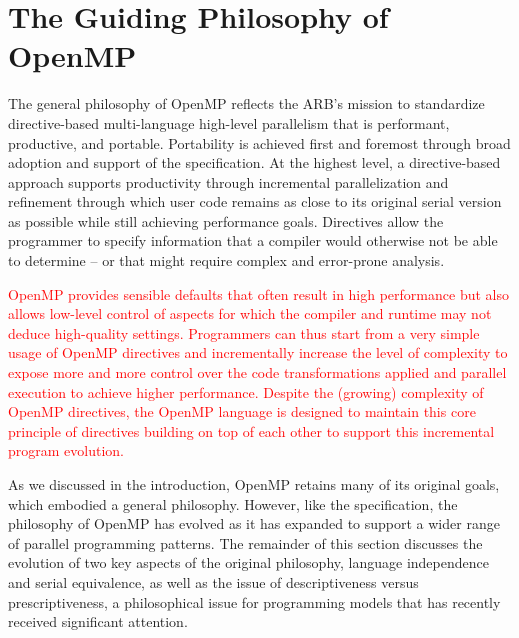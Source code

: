 \section{The Guiding Philosophy of OpenMP}
\label{sec:philosophy}

The general philosophy of OpenMP reflects the ARB's mission to standardize 
directive-based multi-language high-level parallelism that is performant, 
productive, and portable. Portability is achieved first and foremost through
broad adoption and support of the specification. At the highest level, a 
directive-based approach supports productivity through incremental 
parallelization and refinement through which user code remains as close 
to its original serial version as possible while still achieving performance 
goals. Directives allow the programmer to specify information that a compiler
would otherwise not be able to determine -- or that might require complex
and error-prone analysis. 

\textcolor{red}{
OpenMP provides sensible defaults that often result in high
performance but also allows low-level control of aspects for which the compiler
and runtime may not deduce high-quality settings. Programmers can thus start
from a very simple usage of OpenMP directives and incrementally increase the
level of complexity to expose more and more control over the code
transformations applied and parallel execution to achieve higher performance.
Despite the (growing) complexity of OpenMP directives, the OpenMP language is
designed to maintain this core principle of directives building on top of each
other to support this incremental program evolution.
}

As we discussed in the introduction, OpenMP retains many of its original
goals, which embodied a general philosophy. However, like the specification, 
the philosophy of OpenMP has evolved as it has expanded to support a wider
range of parallel programming patterns. The remainder of this section 
discusses the evolution of two key aspects of the original philosophy,
language independence and serial equivalence, as well as the issue of
descriptiveness versus prescriptiveness, a philosophical issue for 
programming models that has recently received significant attention.




